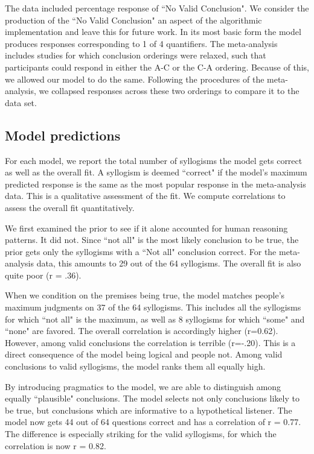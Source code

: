 \documentclass[10pt,letterpaper]{article}
\begin{document}
The data included percentage response of ``No Valid Conclusion". We consider the production of the ``No Valid Conclusion" an aspect of the algorithmic implementation and leave this for future work. In its most basic form the model produces responses corresponding to 1 of 4 quantifiers. The meta-analysis includes studies for which conclusion orderings were relaxed, such that participants could respond in either the A-C or the C-A ordering. Because of this, we allowed our model to do the same. Following the procedures of the meta-analysis, we collapsed responses across these two orderings to compare it to the data set.
\subsection{Model predictions}
For each model, we report the total number of syllogisms the model gets correct as well as the overall fit. A syllogism is deemed ``correct" if the model's maximum predicted response is the same as the most popular response in the meta-analysis data. This is a qualitative assessment of the fit. We compute correlations to assess the overall fit quantitatively. 

We first examined the prior to see if it alone accounted for human reasoning patterns. It did not. Since ``not all" is the most likely conclusion to be true, the prior gets only the syllogisms with a ``Not all" conclusion correct. For the meta-analysis data, this amounts to 29 out of the 64 syllogisms. The overall fit is also quite poor (r = .36). 

When we condition on the premises being true, the model matches people's maximum judgments on 37 of the 64 syllogisms. This includes all the syllogisms for which ``not all" is the maximum, as well as 8 syllogisms for which ``some" and ``none" are favored. The overall correlation is accordingly higher (r=0.62). However, among valid conclusions the correlation is terrible (r=-.20). This is a direct consequence of the model being logical and people not. Among valid conclusions to valid syllogisms, the model ranks them all equally high. 

By introducing pragmatics to the model, we are able to distinguish among equally ``plausible" conclusions. The model selects not only conclusions likely to be true, but conclusions which are informative to a hypothetical listener. The model now gets 44 out of 64 questions correct and has a correlation of r = 0.77. The difference is especially striking for the valid syllogisms, for which the correlation is now r = 0.82. 
\end{document}
